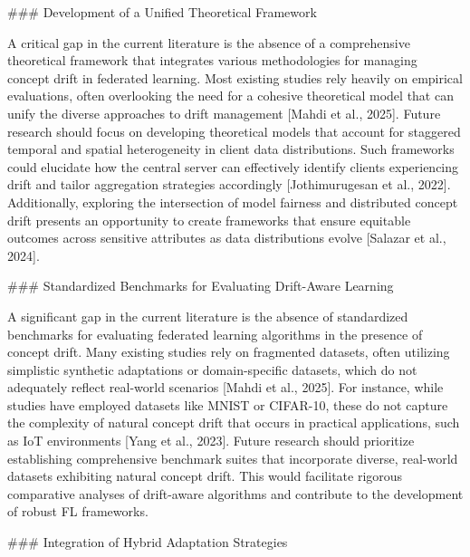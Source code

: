 \documentclass[journal]{IEEEtran}
\begin{document}
\#\#\# Development of a Unified Theoretical Framework

A critical gap in the current literature is the absence of a comprehensive theoretical framework that integrates various methodologies for managing concept drift in federated learning. Most existing studies rely heavily on empirical evaluations, often overlooking the need for a cohesive theoretical model that can unify the diverse approaches to drift management [Mahdi et al., 2025]. Future research should focus on developing theoretical models that account for staggered temporal and spatial heterogeneity in client data distributions. Such frameworks could elucidate how the central server can effectively identify clients experiencing drift and tailor aggregation strategies accordingly [Jothimurugesan et al., 2022]. Additionally, exploring the intersection of model fairness and distributed concept drift presents an opportunity to create frameworks that ensure equitable outcomes across sensitive attributes as data distributions evolve [Salazar et al., 2024].

\#\#\# Standardized Benchmarks for Evaluating Drift-Aware Learning

A significant gap in the current literature is the absence of standardized benchmarks for evaluating federated learning algorithms in the presence of concept drift. Many existing studies rely on fragmented datasets, often utilizing simplistic synthetic adaptations or domain-specific datasets, which do not adequately reflect real-world scenarios [Mahdi et al., 2025]. For instance, while studies have employed datasets like MNIST or CIFAR-10, these do not capture the complexity of natural concept drift that occurs in practical applications, such as IoT environments [Yang et al., 2023]. Future research should prioritize establishing comprehensive benchmark suites that incorporate diverse, real-world datasets exhibiting natural concept drift. This would facilitate rigorous comparative analyses of drift-aware algorithms and contribute to the development of robust FL frameworks.

\#\#\# Integration of Hybrid Adaptation Strategies
\end{document}
